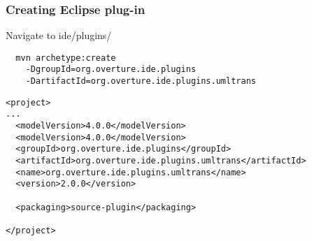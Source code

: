 \begin{frame}[fragile]
  \frametitle{Creating Eclipse plug-in}

Navigate to ide/plugins/
  \begin{lstlisting}
  mvn archetype:create 
	-DgroupId=org.overture.ide.plugins
	-DartifactId=org.overture.ide.plugins.umltrans 
  \end{lstlisting}



\begin{lstlisting}
<project>
...
  <modelVersion>4.0.0</modelVersion>
  <modelVersion>4.0.0</modelVersion>
  <groupId>org.overture.ide.plugins</groupId>
  <artifactId>org.overture.ide.plugins.umltrans</artifactId>
  <name>org.overture.ide.plugins.umltrans</name>
  <version>2.0.0</version>

  <packaging>source-plugin</packaging>

</project>
\end{lstlisting}
\end{frame}

